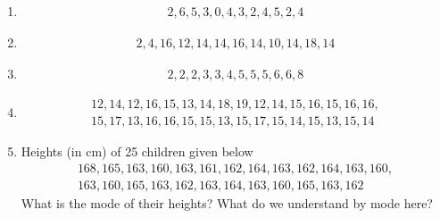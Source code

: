 \begin{enumerate}[label=\thesection.\arabic*, ref=\thesection.\theenumi,resume*]
\item 	
		\begin{gather*}
		2,6,5,3,0,4,3,2,4,5,2,4
	\end{gather*}
\item 
		\begin{gather*}
		2,4,16,12,14,14,16,14,10,14,18,14
	\end{gather*}
	\item 
		\begin{gather*}
		2,2,2,3,3,4,5,5,5,6,6,8
	\end{gather*}
	\item 
		\begin{gather*}
		12, 14, 12, 16, 15, 13, 14, 18, 19, 12, 14, 15, 16, 15, 16, 16,
	\\
		15, 17, 13, 16, 16, 15, 15, 13, 15, 17, 15, 14, 15, 13, 15, 14
		\end{gather*}
	\item Heights (in cm) of 25 children given below
		\begin{gather*}
		168, 165, 163, 160, 163, 161, 162, 164, 163, 162,
164, 163,	160, 
		\\
	 163, 160, 165, 163, 162, 163, 164, 163, 160, 165, 163, 162 
	\end{gather*}
		What is the mode of their heights? What do we understand by mode here?
\end{enumerate}
